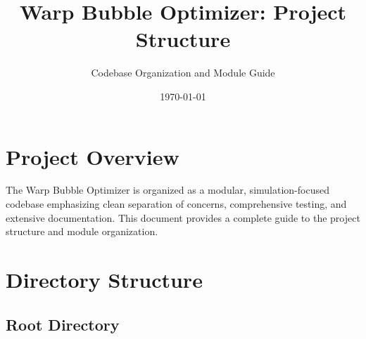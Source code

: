 \documentclass{article}
\title{Warp Bubble Optimizer: Project Structure}
\author{Codebase Organization and Module Guide}
\date{\today}
\begin{document}
\maketitle

\section{Project Overview}

The Warp Bubble Optimizer is organized as a modular, simulation-focused codebase emphasizing clean separation of concerns, comprehensive testing, and extensive documentation. This document provides a complete guide to the project structure and module organization.

\section{Directory Structure}

\subsection{Root Directory}
\end{document}
